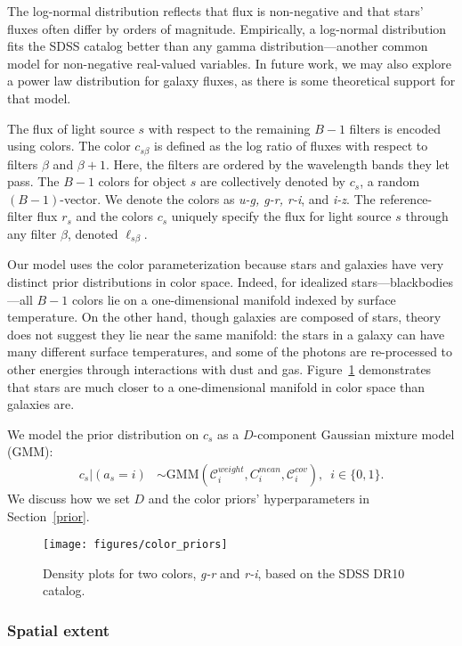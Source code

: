 The log-normal distribution reflects that flux is non-negative and that stars' fluxes often differ by orders of magnitude. Empirically,
a log-normal distribution fits the SDSS catalog better than any gamma distribution---another common model for non-negative real-valued variables.
In future work, we may also explore a power law distribution for galaxy fluxes, as there is some theoretical support for that model.

The flux of light source $s$ with respect to the remaining $B-1$ filters is encoded using colors.
The color $c_{s\beta}$ is defined as the log ratio of
fluxes with respect to filters $\beta$ and $\beta + 1$. Here, the filters are
ordered by the wavelength bands they let pass. The $B-1$ colors for
object $s$ are collectively denoted by $c_s$, a random $(B-1)$-vector.
We denote the colors as \textit{u-g, g-r, r-i}, and \textit{i-z}.
The reference-filter flux $r_s$ and the colors $c_s$ uniquely specify the flux for light source $s$ through any filter $\beta$, denoted $\ell_{s\beta}$.

Our model uses the color parameterization because stars and galaxies have very
distinct prior distributions in color space. Indeed, for idealized
stars---blackbodies---all $B - 1$ colors lie on a one-dimensional manifold
indexed by surface temperature. On the other hand, though galaxies are
composed of stars, theory does not suggest they lie near the same
manifold: the stars in a galaxy can have many different surface
temperatures, and some of the photons are re-processed to other energies
through interactions with dust and gas.
Figure~\ref{color_priors} demonstrates that stars are much closer to a
one-dimensional manifold in color space than galaxies are.

We model the prior distribution on $c_s$ as a $D$-component Gaussian mixture model (GMM):
\begin{align}
c_s | (a_s = i) &\sim \mathrm{GMM}(\mathcal C_{i}^{weight}, C_{i}^{mean}, \mathcal C_{i}^{cov}),\,\,\, i \in \{0,1\}.
\end{align}
We discuss how we set $D$ and the color priors' hyperparameters in Section~\ref{prior}.

\begin{figure}
  \texttt{[image: figures/color\_priors]}
  \caption{Density plots for two colors, \textit{g-r} and \textit{r-i}, based on the SDSS DR10 catalog.}
  \label{color_priors}
\end{figure}


\subsubsection{Spatial extent}

